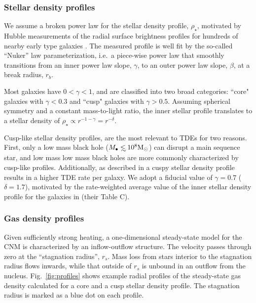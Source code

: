 \documentclass[usenatbib,fleqn]{mnras}
\newcommand\lsim{\mathrel{\rlap{\lower4pt\hbox{\hskip1pt$\sim$}}
    \raise1pt\hbox{$<$}}}
\newcommand{\Mbh}[1][]{M_{\bullet#1}}
\newcommand{\Msun}{{\rm M_\odot}}
\newcommand{\rs}{r_s}
\begin{document}
\subsubsection{Stellar density profiles}
We assume a broken power law for the stellar density profile,
$\rho_{\star}$, motivated by Hubble measurements of the radial surface
brightness profiles for hundreds of nearby early type galaxies
\citep{Lauer+2007}.  The measured profile is well fit by the so-called
``Nuker'' law parameterization, i.e.~a piece-wise power law that smoothly
transitions from an inner power law slope, $\gamma$, to an outer power
law slope, $\beta$, at a break radius, $r_b$.

Most galaxies have $0<\gamma<1$, and are classified into two broad
categories: ``core" galaxies with $\gamma<0.3$ and ``cusp" galaxies with
$\gamma>0.5$. Assuming spherical symmetry and a constant mass-to-light
ratio, the inner stellar profile translates to a stellar density of
$\rho_\star\propto r^{-1-\gamma}=r^{-\delta}$. 

Cusp-like stellar density profiles, are the most relevant to TDEs for
two reasons.  First, only a low mass black hole ($\Mbh\lsim 10^8
\Msun$) can disrupt a main sequence star, and low mass low mass black
holes are more commonly characterized by cusp-like profiles.
Additionally, as described in \citet{Stone&Metzger2016} a cuspy
stellar density profile results in a higher TDE rate per galaxy.  We
adopt a fiducial value of $\gamma=0.7$ ($\delta=1.7$), motivated by
the rate-weighted average value of the inner stellar density profile
for the galaxies in \citet{Stone&Metzger2016} (their Table C).


\subsubsection{Gas density profiles}
Given sufficiently strong heating, a one-dimensional steady-state
model for the CNM is characterized by an inflow-outflow structure.
The velocity passes through zero at the ``stagnation radius'', $\rs$.
Mass loss from stars interior to the stagnation radius flows inwards,
while that outside of $\rs$ is unbound in an outflow from the nucleus.
Fig.~\ref{fig:profiles} shows example radial profiles of the
steady-state gas density calculated for a core and a cusp stellar
density profile. The stagnation radius is marked as a blue dot on each
profile.
\end{document}
